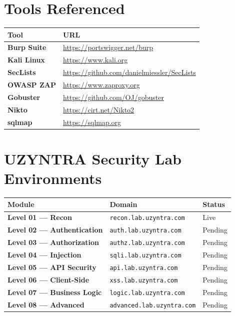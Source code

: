 \section*{Tools Referenced}

\begin{table}[H]
\centering
\begin{tabularx}{\textwidth}{>{\bfseries}lX}
\toprule
Tool & URL \\
\midrule
Burp Suite & \url{https://portswigger.net/burp} \\
Kali Linux & \url{https://www.kali.org} \\
SecLists & \url{https://github.com/danielmiessler/SecLists} \\
OWASP ZAP & \url{https://www.zaproxy.org} \\
Gobuster & \url{https://github.com/OJ/gobuster} \\
Nikto & \url{https://cirt.net/Nikto2} \\
sqlmap & \url{https://sqlmap.org} \\
\bottomrule
\end{tabularx}
\end{table}

\section*{UZYNTRA Security Lab Environments}

\begin{table}[H]
\centering
\begin{tabularx}{\textwidth}{>{\bfseries}lXl}
\toprule
Module & Domain & Status \\
\midrule
Level 01 — Recon & \texttt{recon.lab.uzyntra.com} & Live \\
Level 02 — Authentication & \texttt{auth.lab.uzyntra.com} & Pending \\
Level 03 — Authorization & \texttt{authz.lab.uzyntra.com} & Pending \\
Level 04 — Injection & \texttt{sqli.lab.uzyntra.com} & Pending \\
Level 05 — API Security & \texttt{api.lab.uzyntra.com} & Pending \\
Level 06 — Client-Side & \texttt{xss.lab.uzyntra.com} & Pending \\
Level 07 — Business Logic & \texttt{logic.lab.uzyntra.com} & Pending \\
Level 08 — Advanced & \texttt{advanced.lab.uzyntra.com} & Pending \\
\bottomrule
\end{tabularx}
\end{table}

